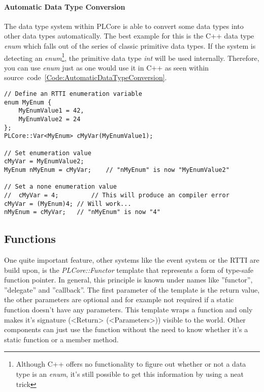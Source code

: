 \paragraph{Automatic Data Type Conversion}
The data type system within PLCore is able to convert some data types into other data types automatically. The best example for this is the C++ data type \emph{enum} which falls out of the series of classic primitive data types. If the system is detecting an \emph{enum}\footnote{Although C++ offers no functionality to figure out whether or not a data type is an \emph{enum}, it's still possible to get this information by using a neat trick}, the primitive data type \emph{int} will be used internally. Therefore, you can use \emph{enum} just as one would use it in C++ as seen within source~code~\ref{Code:AutomaticDataTypeConversion}.
\begin{lstlisting}[float=htb,label=Code:AutomaticDataTypeConversion,caption={Automatic data type conversion}]
// Define an RTTI enumeration variable
enum MyEnum {
	MyEnumValue1 = 42,
	MyEnumValue2 = 24
};
PLCore::Var<MyEnum> cMyVar(MyEnumValue1); 

// Set enumeration value
cMyVar = MyEnumValue2;
MyEnum nMyEnum = cMyVar;	// "nMyEnum" is now "MyEnumValue2"

// Set a none enumeration value
//	cMyVar = 4;			// This will produce an compiler error
cMyVar = (MyEnum)4;	// Will work...
nMyEnum = cMyVar;	// "nMyEnum" is now "4"
\end{lstlisting}




\subsection{Functions}
One quite important feature, other systems like the event system or the RTTI are build upon, is the \emph{PLCore::Functor} template that represents a form of type-safe function pointer. In general, this principle is known under names like ''functor'', ''delegate'' and ''callback''. The first parameter of the template is the return value, the other parameters are optional and for example not required if a static function doesn't have any parameters.  This template wraps a function and only makes it's signature (<Return> (<Parameters>)) visible to the world. Other components can just use the function without the need to know whether it's a static function or a member method.

